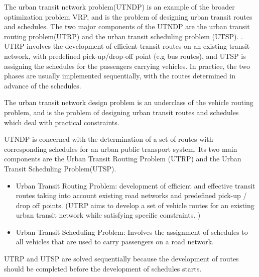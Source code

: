 
The urban transit network problem(UTNDP) is an example of the broader optimization problem VRP, and is the problem of designing urban transit routes and schedules. The two major components of the UTNDP are the urban transit routing problem(UTRP) and the urban transit scheduling problem (UTSP). \citep{fan09}. UTRP involves the development of efficient transit routes on an existing transit network, with predefined pick-up/drop-off point (e.g bus routes), and UTSP is assigning the schedules for the passengers carrying vehicles. In practice, the two phases are usually implemented sequentially, with the routes determined in advance of the schedules. 

The urban transit network design problem is an underclass of the vehicle routing problem, and is the problem of designing urban transit routes and schedules which deal with practical constraints.

UTNDP is concerned with the determination of a set of routes with corresponding schedules for an urban public transport system. Its two main components are the Urban Transit Routing Problem (UTRP) and the Urban Transit Scheduling Problem(UTSP). 
\begin{itemize}
\item Urban Transit Routing Problem: development of efficient and effective transit routes taking into account existing road networks and predefined pick-up / drop off points. (UTRP aims to develop a set of vehicle routes for an existing urban transit network while satisfying specific constraints. )
\item Urban Transit Scheduling Problem: Involves the assignment of schedules to all vehicles that are used to carry passengers on a road network. 
\end{itemize}
UTRP and UTSP are solved sequentially because the development of routes should be completed before the development of schedules starts.
\citep{kechagiopoulos14}



